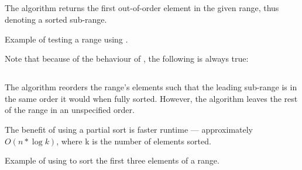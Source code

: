\subsection{\texorpdfstring{}{\texttt{std::is\_sorted\_until}}}

The  algorithm returns the first out-of-order element in the given range, thus denoting a sorted sub-range.


\begin{codebox}[]{\href{https://compiler-explorer.com/z/1dvboE6b1}{\ExternalLink}}
\footnotesize Example of testing a range using .
\tcblower
{}
\end{codebox}

Note that because of the behaviour of , the following is always true:\\
\begin{small}\end{small}

\subsection{\texorpdfstring{}{\texttt{std::partial\_sort}}}

The  algorithm reorders the range's elements such that the leading sub-range is in the same order it would when fully sorted. However, the algorithm leaves the rest of the range in an unspecified order.



The benefit of using a partial sort is faster runtime — approximately $O(n*\log k)$, where k is the number of elements sorted.

\begin{codebox}[]{\href{https://compiler-explorer.com/z/j6xjM4GnT}{\ExternalLink}}
\footnotesize Example of using  to sort the first three elements of a range.
\tcblower
{}
\end{codebox}

